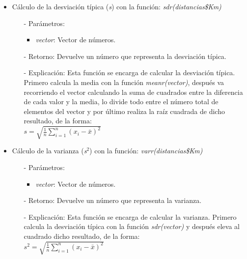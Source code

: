 \documentclass[a4paper, 12pt]{article}
\begin{document}
\begin{itemize}
            \item Cálculo de la desviación típica (\emph{s}) con la función: \emph{sdr(distancias\$Km)}
            \begin{itemize}
                \item[-] Parámetros: 
                \begin{itemize}
                    \item \emph{vector}: Vector de números.
                \end{itemize}

                \item[-] Retorno: Devuelve un número que representa la desviación típica. 

                \item[-] Explicación: Esta función se encarga de calcular la desviación típica. Primero calcula la media con la función \emph{meanr(vector)}, después va recorriendo el vector calculando la suma de cuadrados entre la diferencia de cada valor y la media, lo divide todo entre el número total de elementos del vector y por último realiza la raíz cuadrada de dicho resultado, de la forma: \\
                $s = \sqrt{\frac{1}{n} \sum_{i=1}^{n} (x_i - \bar{x})^2}$
            \end{itemize}
            
            \item Cálculo de la varianza (\emph{s$^2$}) con la función: \emph{varr(distancias\$Km)}
            \begin{itemize}
                \item[-] Parámetros: 
                \begin{itemize}
                    \item \emph{vector}: Vector de números.
                \end{itemize}

                \item[-] Retorno: Devuelve un número que representa la varianza. 

                \item[-] Explicación: Esta función se encarga de calcular la varianza. Primero calcula la desviación típica con la función \emph{sdr(vector)} y después eleva al cuadrado dicho resultado, de la forma: \\
                $s^2 = \sqrt{\frac{1}{n} \sum_{i=1}^{n} (x_i - \bar{x})^2}$
            \end{itemize}
            

\end{itemize}
\end{document}
